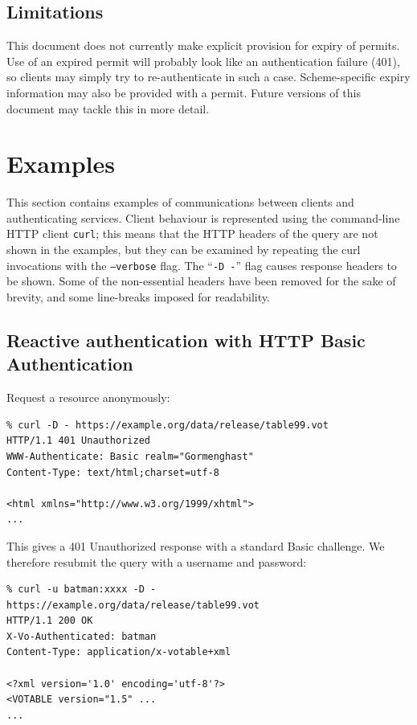 \documentclass[11pt,a4paper]{ivoa}
\begin{document}
\subsection{Limitations}

This document does not currently make explicit provision for
expiry of permits.
Use of an expired permit will probably look like an authentication
failure (401), so clients may simply try to re-authenticate in
such a case.
Scheme-specific expiry information may also be provided with a permit.
Future versions of this document may tackle this in more detail.


\section{Examples}

This section contains examples of communications between clients
and authenticating services.
Client behaviour is represented using the
command-line HTTP client {\tt curl};
this means that the HTTP headers of the query
are not shown in the examples,
but they can be examined by repeating the curl invocations
with the {\tt --verbose} flag.
The ``{\tt -D -}'' flag causes response headers to be shown.
Some of the non-essential headers have been removed for the sake
of brevity, and some line-breaks imposed for readability.

\subsection{Reactive authentication with HTTP Basic Authentication}


Request a resource anonymously:
{\footnotesize
\begin{verbatim}
% curl -D - https://example.org/data/release/table99.vot
HTTP/1.1 401 Unauthorized
WWW-Authenticate: Basic realm="Gormenghast"
Content-Type: text/html;charset=utf-8

<html xmlns="http://www.w3.org/1999/xhtml">
...
\end{verbatim}
}

\noindent
This gives a 401 Unauthorized response
with a standard Basic challenge.
We therefore resubmit the query with a username and password:
{\footnotesize
\begin{verbatim}
% curl -u batman:xxxx -D - https://example.org/data/release/table99.vot
HTTP/1.1 200 OK
X-Vo-Authenticated: batman
Content-Type: application/x-votable+xml

<?xml version='1.0' encoding='utf-8'?>
<VOTABLE version="1.5" ...
...
\end{verbatim}
}
\end{document}
